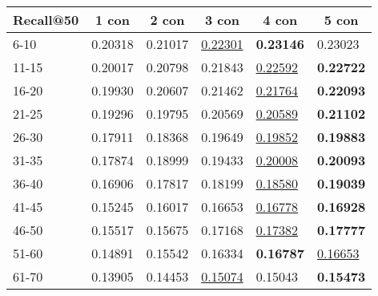 \begin{table*}[]
    \begin{tabular}{|l|l|l|l|l|l|}
        \hline
        Recall@50 & \multicolumn{1}{c|}{1 con} & \multicolumn{1}{c|}{2 con} & \multicolumn{1}{c|}{3 con} & \multicolumn{1}{c|}{4 con} & \multicolumn{1}{c|}{5 con} \\ \hline
        6-10      & 0.20318                    & 0.21017                    & \underline{0.22301}        & \textbf{0.23146}           & 0.23023                    \\ \hline
        11-15     & 0.20017                    & 0.20798                    & 0.21843                    & \underline{0.22592}        & \textbf{0.22722}           \\ \hline
        16-20     & 0.19930                    & 0.20607                    & 0.21462                    & \underline{0.21764}        & \textbf{0.22093}           \\ \hline
        21-25     & 0.19296                    & 0.19795                    & 0.20569                    & \underline{0.20589}        & \textbf{0.21102}           \\ \hline
        26-30     & 0.17911                    & 0.18368                    & 0.19649                    & \underline{0.19852}        & \textbf{0.19883}           \\ \hline
        31-35     & 0.17874                    & 0.18999                    & 0.19433                    & \underline{0.20008}        & \textbf{0.20093}           \\ \hline
        36-40     & 0.16906                    & 0.17817                    & 0.18199                    & \underline{0.18580}        & \textbf{0.19039}           \\ \hline
        41-45     & 0.15245                    & 0.16017                    & 0.16653                    & \underline{0.16778}        & \textbf{0.16928}           \\ \hline
        46-50     & 0.15517                    & 0.15675                    & 0.17168                    & \underline{0.17382}        & \textbf{0.17777}           \\ \hline
        51-60     & 0.14891                    & 0.15542                    & 0.16334                    & \textbf{0.16787}           & \underline{0.16653}        \\ \hline
        61-70     & 0.13905                    & 0.14453                    & \underline{0.15074}        & 0.15043                    & \textbf{0.15473}           \\ \hline

\end{tabular}
\end{table*}
